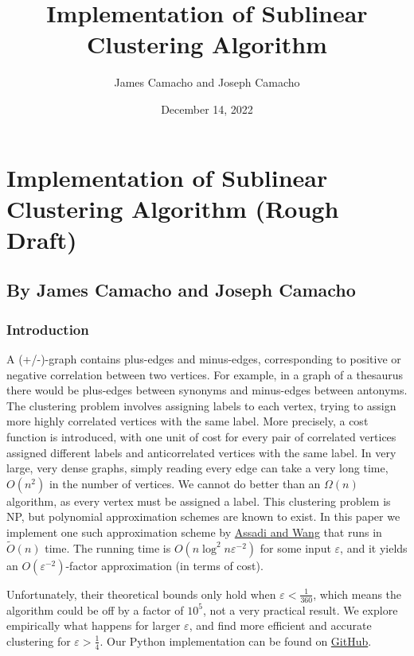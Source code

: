 \documentclass[
]{article}
\title{Implementation of Sublinear Clustering Algorithm}
\author{James Camacho and Joseph Camacho}
\date{December 14, 2022}
\begin{document}
\maketitle

\hypertarget{implementation-of-sublinear-clustering-algorithm-rough-draft}{%
  \section{Implementation of Sublinear Clustering Algorithm (Rough
    Draft)}\label{implementation-of-sublinear-clustering-algorithm-rough-draft}}

\hypertarget{by-james-camacho-and-joseph-camacho}{%
  \subsection{By James Camacho and Joseph
    Camacho}\label{by-james-camacho-and-joseph-camacho}}

\hypertarget{introduction}{%
  \subsubsection{Introduction}\label{introduction}}

A (+/-)-graph contains plus-edges and minus-edges, corresponding to positive or negative correlation between two vertices. For example, in a graph of a thesaurus there would be plus-edges between synonyms and minus-edges between antonyms. The clustering problem involves assigning labels to each vertex, trying to assign more highly correlated vertices with the same label. More precisely, a cost function is introduced, with one unit of cost for every pair of correlated vertices assigned different labels and anticorrelated vertices with the same label. In very large, very dense graphs, simply reading every edge can take a very long time, $O(n^2)$ in the number of vertices. We cannot do better than an $\Omega(n)$ algorithm, as every vertex must be assigned a label. This clustering problem is NP, but polynomial approximation schemes are known to exist. In this paper we implement one such approximation scheme by \href{https://doi.org/10.48550/arxiv.2109.14528}{Assadi and Wang} that runs in $\tilde{O}(n)$ time. The running time is $O(n\log^2 n\varepsilon^{-2})$ for some input $\varepsilon$, and it yields an $O(\varepsilon^{-2})$-factor approximation (in terms of cost).

Unfortunately, their theoretical bounds only hold when $\varepsilon < \frac{1}{360}$, which means the algorithm could be off by a factor of $10^5$, not a very practical result. We explore empirically what happens for larger $\varepsilon$, and find more efficient and accurate clustering for $\varepsilon > \frac14$. Our Python implementation can be found on \href{https://github.com/cooljoseph1/Clustering-Algorithm-Implementation}{GitHub}.
\end{document}
